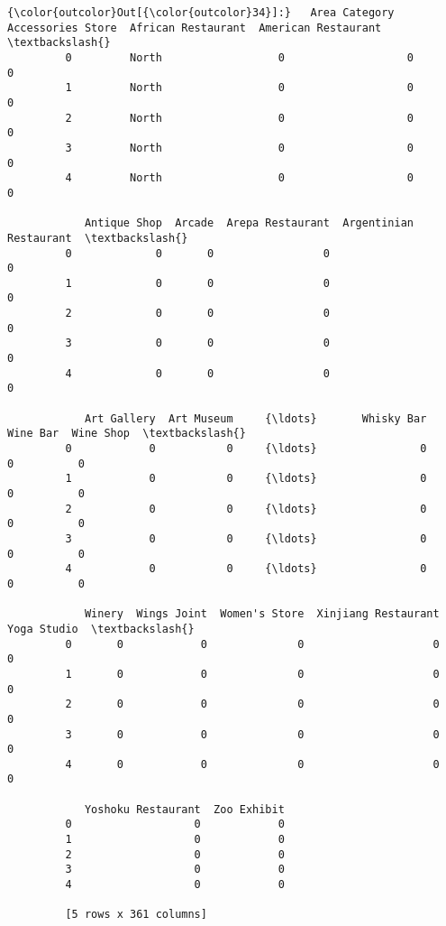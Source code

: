 \documentclass[11pt]{article}
\begin{document}
\begin{Verbatim}[commandchars=\\\{\}]
{\color{outcolor}Out[{\color{outcolor}34}]:}   Area Category  Accessories Store  African Restaurant  American Restaurant  \textbackslash{}
         0         North                  0                   0                    0   
         1         North                  0                   0                    0   
         2         North                  0                   0                    0   
         3         North                  0                   0                    0   
         4         North                  0                   0                    0   
         
            Antique Shop  Arcade  Arepa Restaurant  Argentinian Restaurant  \textbackslash{}
         0             0       0                 0                       0   
         1             0       0                 0                       0   
         2             0       0                 0                       0   
         3             0       0                 0                       0   
         4             0       0                 0                       0   
         
            Art Gallery  Art Museum     {\ldots}       Whisky Bar  Wine Bar  Wine Shop  \textbackslash{}
         0            0           0     {\ldots}                0         0          0   
         1            0           0     {\ldots}                0         0          0   
         2            0           0     {\ldots}                0         0          0   
         3            0           0     {\ldots}                0         0          0   
         4            0           0     {\ldots}                0         0          0   
         
            Winery  Wings Joint  Women's Store  Xinjiang Restaurant  Yoga Studio  \textbackslash{}
         0       0            0              0                    0            0   
         1       0            0              0                    0            0   
         2       0            0              0                    0            0   
         3       0            0              0                    0            0   
         4       0            0              0                    0            0   
         
            Yoshoku Restaurant  Zoo Exhibit  
         0                   0            0  
         1                   0            0  
         2                   0            0  
         3                   0            0  
         4                   0            0  
         
         [5 rows x 361 columns]
\end{Verbatim}
            
\end{document}
